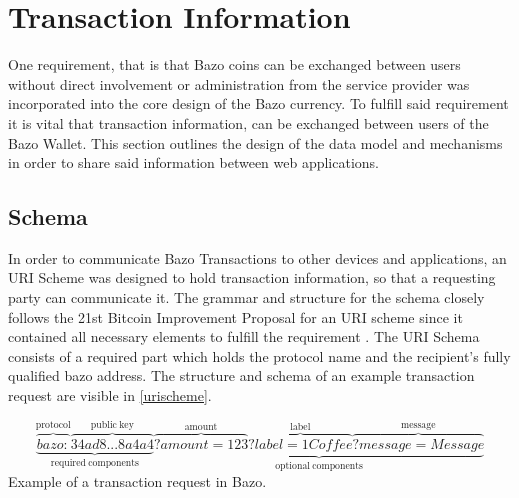 \section{Transaction Information} \label{transactioninfo}
One requirement, that is that Bazo coins can be exchanged between users without direct involvement or administration from the service provider was incorporated into the core design of the Bazo currency. To fulfill said requirement it is vital that transaction information, can be exchanged between users of the Bazo Wallet. This section outlines the design of the data model and mechanisms in order to share said information between web applications.
\subsection{Schema}\label{schema}
In order to communicate Bazo Transactions to other devices and applications, an URI Scheme was designed to hold transaction information, so that a requesting party can communicate it. The grammar and structure for the schema closely follows the 21st Bitcoin Improvement Proposal for an URI scheme since it contained all necessary elements to fulfill the requirement \cite{bip21}. The URI Schema consists of a required part which holds the protocol name and the recipient's fully qualified bazo address. The structure and schema of an example transaction request are visible in \ref{urischeme}.


\[
\underbrace{\overbrace{bazo:}^{\mathrm{protocol}}\overbrace{34ad8...8a4a4}^{\mathrm{public\ key}}}_{\mathrm{required\ components}}
\underbrace{\overbrace{?amount=123}^{\mathrm{amoun t}}\overbrace{?label=1 Coffee}^{\mathrm{label}}\overbrace{?message=Message}^{\mathrm{message}}}_{\mathrm{optional\ components}}
\]\label{fig:urischeme} Example of a transaction request in Bazo.


